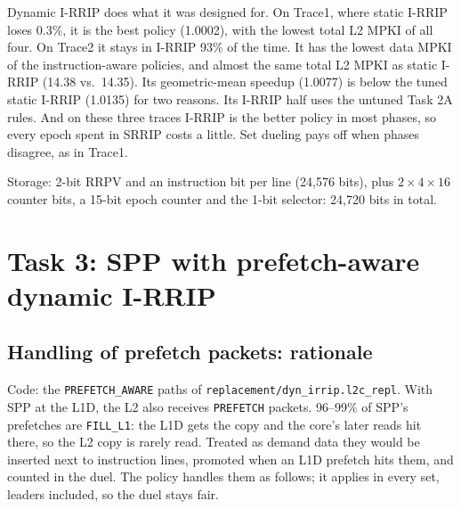 \documentclass[12pt]{report}
\newcommand{\cfg}[1]{\texttt{#1}}
\begin{document}
Dynamic I-RRIP does what it was designed for. On Trace1, where static
I-RRIP loses 0.3\%, it is the best policy (1.0002), with the lowest total L2
MPKI of all four. On Trace2 it stays in I-RRIP 93\% of the time. It has the
lowest data MPKI of the instruction-aware policies, and almost the same total
L2 MPKI as static I-RRIP (14.38 vs.\ 14.35). Its geometric-mean speedup
(1.0077) is below the tuned static I-RRIP (1.0135) for two reasons. Its
I-RRIP half uses the untuned Task 2A rules. And on these three traces I-RRIP
is the better policy in most phases, so every epoch spent in SRRIP costs a
little. Set dueling pays off when phases disagree, as in Trace1.

Storage: 2-bit RRPV and an instruction bit per line (24,576 bits), plus
$2\times4\times16$ counter bits, a 15-bit epoch counter and the 1-bit
selector: 24,720 bits in total.

\chapter{Task 3: SPP with prefetch-aware dynamic I-RRIP}

\section{Handling of prefetch packets: rationale}

Code: the \cfg{PREFETCH\_AWARE} paths of \cfg{replacement/dyn\_irrip.l2c\_repl}.
With SPP at the L1D, the L2 also receives \cfg{PREFETCH} packets. 96--99\% of
SPP's prefetches are \cfg{FILL\_L1}: the L1D gets the copy and the core's
later reads hit there, so the L2 copy is rarely read. Treated as demand data
they would be inserted next to instruction lines, promoted when an L1D
prefetch hits them, and counted in the duel. The policy handles them as
follows; it applies in every set, leaders included, so the duel stays fair.
\end{document}
